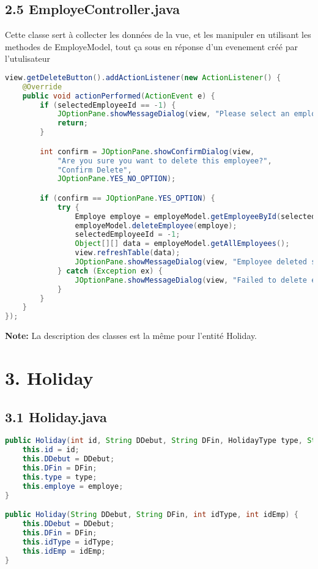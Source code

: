 \documentclass[a4paper,12pt]{report}
\begin{document}
\subsection*{\textcolor{mygreen}{2.5 EmployeController.java}}
Cette classe sert à collecter les données de la vue, et les manipuler en utilisant les methodes de EmployeModel, tout ça sous en réponse d'un evenement créé par l'utulisateur
\begin{lstlisting}[language=Java, caption=action de la boutton supprimer]
view.getDeleteButton().addActionListener(new ActionListener() {
    @Override
    public void actionPerformed(ActionEvent e) {
        if (selectedEmployeeId == -1) {
            JOptionPane.showMessageDialog(view, "Please select an employee to delete." , "Error", JOptionPane.ERROR_MESSAGE);
            return;
        }

        int confirm = JOptionPane.showConfirmDialog(view, 
            "Are you sure you want to delete this employee?", 
            "Confirm Delete", 
            JOptionPane.YES_NO_OPTION);

        if (confirm == JOptionPane.YES_OPTION) {
            try {
                Employe employe = employeModel.getEmployeeById(selectedEmployeeId);
                employeModel.deleteEmployee(employe);
                selectedEmployeeId = -1;
                Object[][] data = employeModel.getAllEmployees();
                view.refreshTable(data);
                JOptionPane.showMessageDialog(view, "Employee deleted successfully!", "Success", JOptionPane.INFORMATION_MESSAGE);
            } catch (Exception ex) {
                JOptionPane.showMessageDialog(view, "Failed to delete employee: " + ex.getMessage(), "Error", JOptionPane.ERROR_MESSAGE);
            }
        }
    }
});
\end{lstlisting}


\textbf{Note:} La description des classes est la même pour l'entité Holiday.
\newpage
\section*{\textcolor{myblue}{3. Holiday}}

\subsection*{\textcolor{mygreen}{3.1 Holiday.java}}
\begin{lstlisting}[language=Java, caption=Constructeurs de Holiday]
public Holiday(int id, String DDebut, String DFin, HolidayType type, String employe) {
    this.id = id;
    this.DDebut = DDebut;
    this.DFin = DFin;
    this.type = type;
    this.employe = employe;
}

public Holiday(String DDebut, String DFin, int idType, int idEmp) {
    this.DDebut = DDebut;
    this.DFin = DFin;
    this.idType = idType;
    this.idEmp = idEmp;
}
\end{lstlisting}
\end{document}
